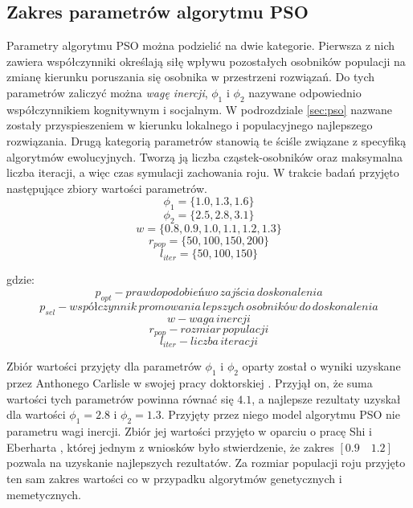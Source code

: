 \subsection{Zakres parametrów algorytmu PSO}
\par
Parametry algorytmu PSO można podzielić na dwie kategorie. Pierwsza z nich zawiera współczynniki określają siłę wpływu pozostałych osobników populacji na zmianę kierunku poruszania się osobnika w przestrzeni rozwiązań. Do tych parametrów zaliczyć można \emph{wagę inercji}, $\phi_1$ i $\phi_2$ nazywane odpowiednio współczynnikiem kognitywnym i socjalnym. W podrozdziale \ref{sec:pso} nazwane zostały przyspieszeniem w kierunku lokalnego i populacyjnego najlepszego rozwiązania. Drugą kategorią parametrów stanowią te ściśle związane z specyfiką algorytmów ewolucyjnych. Tworzą ją liczba cząstek-osobników oraz maksymalna liczba iteracji, a więc czas symulacji zachowania roju. W trakcie badań przyjęto następujące zbiory wartości parametrów.
\[\phi_1 = \lbrace1.0, 1.3, 1.6 \rbrace\]
\[\phi_2 = \lbrace2.5, 2.8, 3.1\rbrace\]
\[w = \lbrace0.8, 0.9, 1.0, 1.1, 1.2, 1.3\rbrace\]
\[r_{pop} = \lbrace50, 100, 150, 200\rbrace\]
\[l_{iter}=\lbrace50, 100, 150\rbrace\]

gdzie:
\[p_{opt} - prawdopodobieńwo\,zajścia\, doskonalenia\]
\[p_{sel} - współczynnik\, promowania\, lepszych\, osobników\, do\, doskonalenia\]
\[w - waga\, inercji\]
\[r_{pop} - rozmiar\, populacji\]
\[l_{iter} - liczba\, iteracji\]
\par
Zbiór wartości przyjęty dla parametrów $\phi_1$ i $\phi_2$ oparty został o wyniki uzyskane przez Anthonego Carlisle w swojej pracy doktorskiej \cite{carlisle2002applying}. Przyjął on, że suma wartości tych parametrów powinna równać się $4.1$, a najlepsze rezultaty uzyskał dla wartości $\phi_1=2.8$ i $\phi_2=1.3$. Przyjęty przez niego model algorytmu PSO nie parametru wagi inercji. Zbiór jej wartości przyjęto w oparciu o pracę Shi i Eberharta \cite{shi1998modified}, której jednym z wniosków było stwierdzenie, że zakres $[0.9\quad1.2]$ pozwala na uzyskanie najlepszych rezultatów. Za rozmiar populacji roju przyjęto ten sam zakres wartości co w przypadku algorytmów genetycznych i memetycznych.

